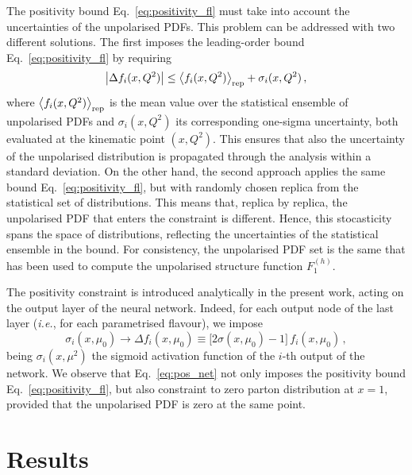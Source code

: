 The positivity bound Eq.~\eqref{eq:positivity_fl} must take into account the uncertainties of the unpolarised PDFs. This problem can be addressed with two different solutions. The first imposes the leading-order bound Eq.~\eqref{eq:positivity_fl} by requiring
\begin{equation}
  \left| \Delta f_i (x,Q^2) \right| \leq \left<f_i (x,Q^2)\right>_{\textrm{rep}} + \sigma_i(x,Q^2) \,,
  \label{eq:positivity_fl_sigma}
\end{equation}
where $\left<f_i (x,Q^2)\right>_{\textrm{rep}}$ is the mean value over the statistical ensemble of unpolarised PDFs and $\sigma_i(x,Q^2)$ its corresponding one-sigma uncertainty, both evaluated at the kinematic point $(x,Q^2)$. This ensures that also the uncertainty of the unpolarised distribution is propagated through the analysis within a standard deviation. On the other hand, the second approach applies the same bound Eq.~\eqref{eq:positivity_fl}, but with randomly chosen replica from the statistical set of distributions. This means that, replica by replica, the unpolarised PDF that enters the constraint is different. Hence, this stocasticity spans the space of distributions, reflecting the uncertainties of the statistical ensemble in the bound. For consistency, the unpolarised PDF set is the same that has been used to compute the unpolarised structure function $F_1^{(h)}$. %

The positivity constraint is introduced analytically in the present work, acting on the output layer of the neural network. Indeed, for each output node of the last layer (\textit{i.e.}, for each parametrised flavour), we impose
\begin{equation}
  \sigma_{i} (x,\mu_0) \rightarrow \Delta f_{i} (x, \mu_0) \equiv \bigl[ 2 \sigma(x,\mu_0) - 1 \bigr] \, f_{i} (x,\mu_0) \,,
  \label{eq:pos_net}
\end{equation}
being $\sigma_i(x,\mu^2)$ the sigmoid activation function of the $i$-th output of the network. We observe that Eq.~\eqref{eq:pos_net} not only imposes the positivity bound Eq.~\eqref{eq:positivity_fl}, but also constraint to zero parton distribution at $x=1$, provided that the unpolarised PDF is zero at the same point. 

\section{Results}
\label{sec:4.4}


